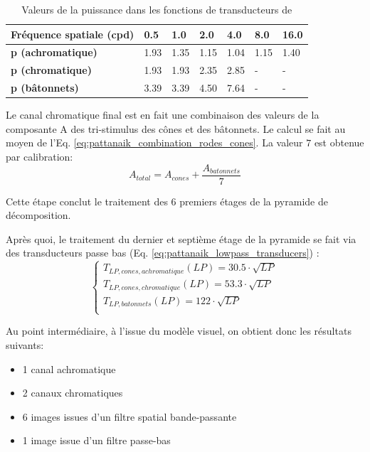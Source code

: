 	\begin{table}
		\centering
		\label{tab:pattanaik_transducers_p_values}
		\small
		\begin{tabular}{|l|l|l|l|l|l|l|}
			\hline
			\textbf{Fréquence spatiale (cpd)} & \textbf{0.5} & \textbf{1.0} & \textbf{2.0} & \textbf{4.0} & \textbf{8.0} & \textbf{16.0}\\
			\hline
			\hline	
			\textbf{p (achromatique)} & 1.93 & 1.35 & 1.15 & 1.04 & 1.15 & 1.40\\
			\hline
			\textbf{p (chromatique)} & 1.93 & 1.93 & 2.35 & 2.85 & - & -\\
			\hline
			\textbf{p (bâtonnets)} & 3.39 & 3.39 & 4.50 & 7.64 & - & -\\
			\hline
		\end{tabular}
		\caption{Valeurs de la puissance dans les fonctions de transducteurs de \cite{watson_model_1997}}
	\end{table}
	
	\par Le canal chromatique final est en fait une combinaison des valeurs de la composante A des tri-stimulus des cônes et des bâtonnets. Le calcul se fait au moyen de l'Eq. \ref{eq:pattanaik_combination_rodes_cones}. La valeur $7$ est obtenue par calibration:
	\begin{equation}
		A_{total} = A_{cones} + \frac{A_{batonnets}}{7}
		\label{eq:pattanaik_combination_rodes_cones}
	\end{equation}
	
	\par Cette étape conclut le traitement des 6 premiers étages de la pyramide de décomposition.
	
	\par Après quoi, le traitement du dernier et septième étage de la pyramide se fait via des transducteurs passe bas (Eq. \ref{eq:pattanaik_lowpass_transducers}) \citep{fairchild_color_1998}:
	\begin{equation}
		\begin{cases}
			T_{LP,cones,achromatique}(LP) = 30.5 \cdot \sqrt{LP}\\
			T_{LP,cones,chromatique}(LP) = 53.3 \cdot \sqrt{LP}\\
			T_{LP,batonnets}(LP) = 122 \cdot \sqrt{LP}\\
		\end{cases}
		\label{eq:pattanaik_lowpass_transducers}
	\end{equation}
	
	\par Au point intermédiaire, à l'issue du modèle visuel, on obtient donc les résultats suivants:
	\begin{itemize}
		\item 1 canal achromatique
		\item 2 canaux chromatiques
		\item 6 images issues d'un filtre spatial bande-passante
		\item 1 image issue d'un filtre passe-bas
	\end{itemize}
	
